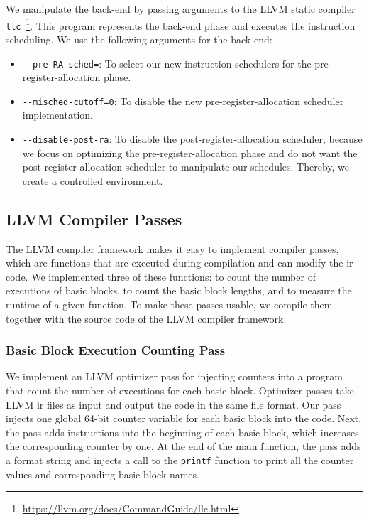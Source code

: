 We manipulate the back-end by passing arguments to the LLVM static compiler \lstinline{llc}~\footnote{\url{https://llvm.org/docs/CommandGuide/llc.html}}.
This program represents the back-end phase and executes the instruction scheduling.
We use the following arguments for the back-end:
\begin{itemize}
    \item \lstinline{--pre-RA-sched=}: To select our new instruction schedulers for the pre-register-allocation phase.
    \item \lstinline{--misched-cutoff=0}: To disable the new pre-register-allocation scheduler implementation.
    \item \lstinline{--disable-post-ra}: To disable the post-register-allocation scheduler, because we focus on optimizing the pre-register-allocation phase and do not want the post-register-allocation scheduler to manipulate our schedules. Thereby, we create a controlled environment.
\end{itemize}

\subsection{LLVM Compiler Passes}
\label{sec:approach:llvm-passes}
The LLVM compiler framework makes it easy to implement compiler passes, which are functions that are executed during compilation and can modify the \ac{ir} code.
We implemented three of these functions: to count the number of executions of basic blocks, to count the basic block lengths, and to measure the runtime of a given function.
To make these passes usable, we compile them together with the source code of the LLVM compiler framework.

\subsubsection{Basic Block Execution Counting Pass}
\label{sec:approach:pass-count}
We implement an LLVM optimizer pass for injecting counters into a program that count the number of executions for each basic block.
Optimizer passes take LLVM \ac{ir} files as input and output the code in the same file format.
Our pass injects one global 64-bit counter variable for each basic block into the code.
Next, the pass adds instructions into the beginning of each basic block, which increases the corresponding counter by one.
At the end of the main function, the pass adds a format string and injects a call to the \lstinline{printf} function to print all the counter values and corresponding basic block names.

